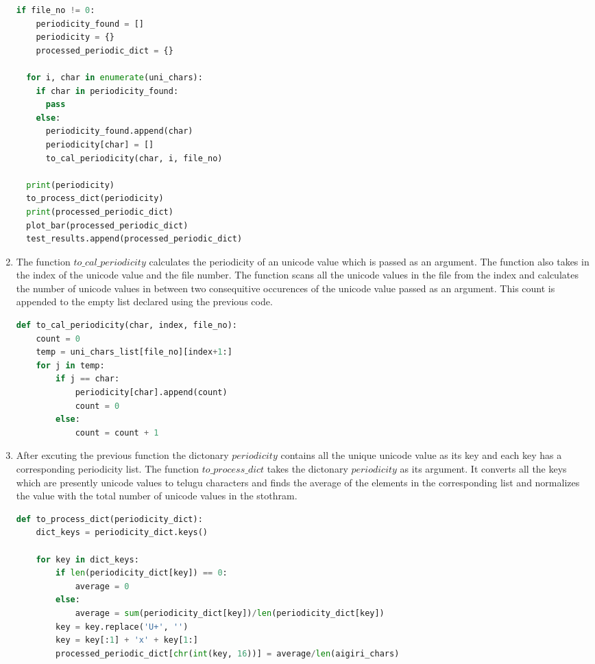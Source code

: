 \begin{enumerate}[label=\thesection.\arabic*.,ref=\thesection.\theenumi]
\begin{lstlisting}[language=Python]
  if file_no != 0:
    periodicity_found = []
    periodicity = {}
    processed_periodic_dict = {}

  for i, char in enumerate(uni_chars):
    if char in periodicity_found:
      pass
    else:
      periodicity_found.append(char)
      periodicity[char] = []
      to_cal_periodicity(char, i, file_no)
    
  print(periodicity)
  to_process_dict(periodicity)
  print(processed_periodic_dict)
  plot_bar(processed_periodic_dict)
  test_results.append(processed_periodic_dict)
\end{lstlisting}

\item The function $to\_cal\_periodicity$ calculates the periodicity of an unicode value which is passed as an argument. The function also takes in the index of the unicode value and the file number. The function scans all the unicode values in the file from the index and calculates the number of unicode values in between two consequitive occurences of the unicode value passed as an argument. This count is appended to the empty list declared using the previous code.
\begin{lstlisting}[language=Python]
def to_cal_periodicity(char, index, file_no):
    count = 0
    temp = uni_chars_list[file_no][index+1:]
    for j in temp:
        if j == char:
            periodicity[char].append(count)
            count = 0
        else:
            count = count + 1
\end{lstlisting}

\item After excuting the previous function the dictonary $periodicity$ contains all the unique unicode value as its key and each key has a corresponding periodicity list. The function 
$to\_process\_dict$ takes the dictonary $periodicity$ as its argument. It converts all the keys which are presently unicode values to telugu characters and finds the average of the elements in the corresponding list and normalizes the value with the total number of unicode values in the stothram.  
\begin{lstlisting}[language=Python]
def to_process_dict(periodicity_dict):
    dict_keys = periodicity_dict.keys()
    
    for key in dict_keys:
        if len(periodicity_dict[key]) == 0:
            average = 0
        else:
            average = sum(periodicity_dict[key])/len(periodicity_dict[key])
        key = key.replace('U+', '')
        key = key[:1] + 'x' + key[1:]
        processed_periodic_dict[chr(int(key, 16))] = average/len(aigiri_chars)
\end{lstlisting}


\end{enumerate}
